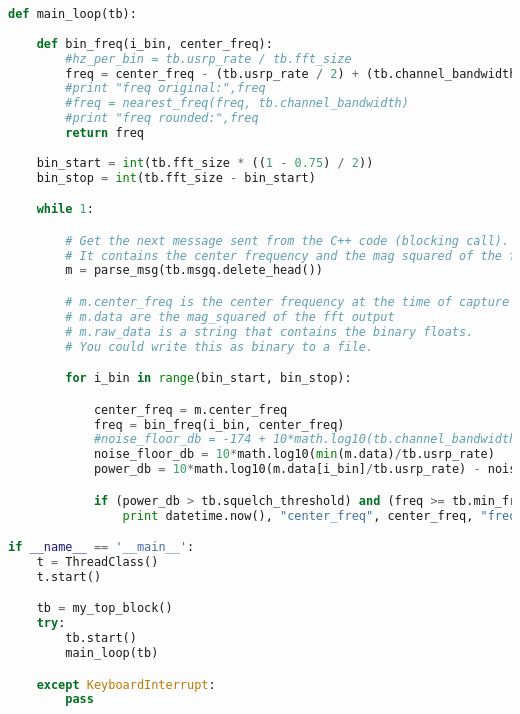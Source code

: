 \begin{lstlisting}[language=Python]
def main_loop(tb):
    
    def bin_freq(i_bin, center_freq):
        #hz_per_bin = tb.usrp_rate / tb.fft_size
        freq = center_freq - (tb.usrp_rate / 2) + (tb.channel_bandwidth * i_bin)
        #print "freq original:",freq
        #freq = nearest_freq(freq, tb.channel_bandwidth)
        #print "freq rounded:",freq
        return freq
    
    bin_start = int(tb.fft_size * ((1 - 0.75) / 2))
    bin_stop = int(tb.fft_size - bin_start)

    while 1:

        # Get the next message sent from the C++ code (blocking call).
        # It contains the center frequency and the mag squared of the fft
        m = parse_msg(tb.msgq.delete_head())

        # m.center_freq is the center frequency at the time of capture
        # m.data are the mag_squared of the fft output
        # m.raw_data is a string that contains the binary floats.
        # You could write this as binary to a file.

        for i_bin in range(bin_start, bin_stop):

            center_freq = m.center_freq
            freq = bin_freq(i_bin, center_freq)
            #noise_floor_db = -174 + 10*math.log10(tb.channel_bandwidth)
            noise_floor_db = 10*math.log10(min(m.data)/tb.usrp_rate)
            power_db = 10*math.log10(m.data[i_bin]/tb.usrp_rate) - noise_floor_db

            if (power_db > tb.squelch_threshold) and (freq >= tb.min_freq) and (freq <= tb.max_freq):
                print datetime.now(), "center_freq", center_freq, "freq", freq, "power_db", power_db, "noise_floor_db", noise_floor_db

if __name__ == '__main__':
    t = ThreadClass()
    t.start()

    tb = my_top_block()
    try:
        tb.start()
        main_loop(tb)

    except KeyboardInterrupt:
        pass

    
\end{lstlisting}
